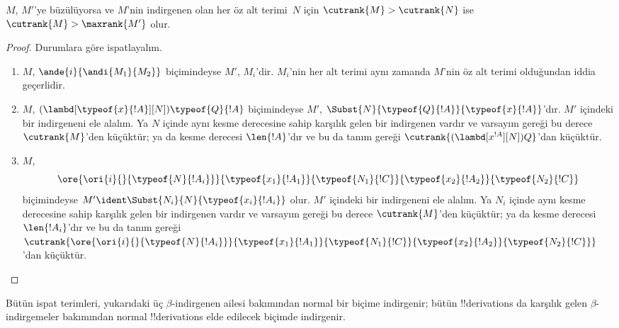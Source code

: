 \begin{lem}
  $M$, $M'$'ye büzülüyorsa ve $M$'nin indirgenen olan her öz alt
  terimi~$N$ için $\cutrank{M} > \cutrank{N}$ ise
  $\cutrank{M} > \maxrank{M'}$ olur.
\end{lem}

\begin{proof}
  Durumlara göre ispatlayalım.
  \begin{enumerate}
  \item $M$, $\ande{i}{\andi{M_1}{M_2}}$ biçimindeyse $M'$, $M_i$'dir.
    $M_i$'nin her alt terimi aynı zamanda $M$'nin öz alt terimi olduğundan
    iddia geçerlidir.
  \item $M$,
    $(\lambd[\typeof{x}{!A}][N])\typeof{Q}{!A}$ biçimindeyse $M'$,
    $\Subst{N}{\typeof{Q}{!A}}{\typeof{x}{!A}}$'dır. $M'$ içindeki bir
    indirgeneni ele alalım. Ya $N$ içinde aynı kesme derecesine sahip
    karşılık gelen bir indirgenen vardır ve varsayım gereği bu derece
    $\cutrank{M}$'den küçüktür; ya da kesme derecesi $\len{!A}$'dır ve bu
    da tanım gereği
    $\cutrank{(\lambd[x^{!A}][N])Q}$'dan küçüktür.
  \item $M$,
    \[
    \ore{\ori{i}{}{\typeof{N}{!A_i}}}
        {\typeof{x_1}{!A_1}}{\typeof{N_1}{!C}}
        {\typeof{x_2}{!A_2}}{\typeof{N_2}{!C}}
    \]
    biçimindeyse $M' \ident \Subst{N_i}{N}{\typeof{x_i}{!A_i}}$ olur.
    $M'$ içindeki bir indirgeneni ele alalım. Ya $N_i$ içinde aynı kesme
    derecesine sahip karşılık gelen bir indirgenen vardır ve varsayım gereği
    bu derece $\cutrank{M}$'den küçüktür; ya da kesme derecesi
    $\len{!A_i}$'dır ve bu da tanım gereği
    $\cutrank{\ore{\ori{i}{}{\typeof{N}{!A_i}}}
      {\typeof{x_1}{!A_1}}{\typeof{N_1}{!C}}
      {\typeof{x_2}{!A_2}}{\typeof{N_2}{!C}}}$'dan küçüktür.
  \end{enumerate}
\end{proof}

\begin{thm}
  Bütün ispat terimleri, yukarıdaki üç $\beta$-indirgenen ailesi bakımından
  normal bir biçime indirgenir; bütün !!{derivation}s da karşılık gelen
  $\beta$-indirgemeler bakımından normal !!{derivation}s elde edilecek biçimde
  indirgenir.
\end{thm}

